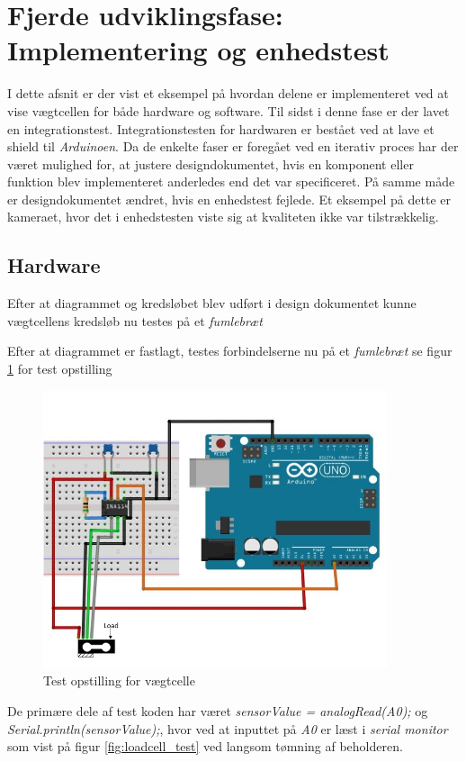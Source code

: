 \section{Fjerde udviklingsfase: Implementering og enhedstest}
\label{subsec:Implement}
I dette afsnit er der vist et eksempel på hvordan delene er implementeret ved at vise vægtcellen for både hardware og software. Til sidst i denne fase er der lavet en integrationstest. Integrationstesten for hardwaren er bestået ved at lave et shield til \textit{Arduinoen}. Da de enkelte faser er foregået ved en iterativ proces har der været mulighed for, at justere designdokumentet, hvis en komponent eller funktion blev implementeret anderledes end det var specificeret. På samme måde er designdokumentet ændret, hvis en enhedstest fejlede. Et eksempel på dette er kameraet, hvor det i enhedstesten viste sig at kvaliteten ikke var tilstrækkelig.  

\subsection{Hardware}
Efter at diagrammet og kredsløbet blev udført i design dokumentet kunne vægtcellens kredsløb nu testes på et \textit{fumlebræt} 

Efter at diagrammet er fastlagt, testes forbindelserne nu på et \textit{fumlebræt} se figur \ref{fig:loadcelltest} for test opstilling

  \begin{figure}[H]
	\centering
	\includegraphics[width=0.9\textwidth]{billeder/Hardware/diagrammer/Drawing1.jpg}
	\caption{Test opstilling for vægtcelle}
	\label{fig:loadcelltest}
\end{figure}
De primære dele af test koden har været  \textit{sensorValue = analogRead(A0);} og \textit{Serial.println(sensorValue);}, hvor ved at inputtet på \textit{A0} er læst i \textit{serial monitor} som vist på figur \ref{fig:loadcell_test} ved langsom tømning af beholderen.

